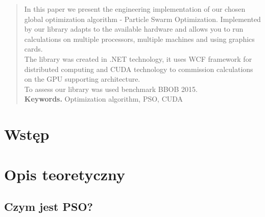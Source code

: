 \documentclass[12pt, twoside, openany, abstract=on]{report}
\theoremstyle{definition}
\begin{document}
\newpage
{}
\begin{abstract}
In this paper we present the engineering implementation of our chosen global optimization algorithm - Particle Swarm Optimization. Implemented by our library adapts to the available hardware and allows you to run calculations on multiple processors, multiple machines and using graphics cards. \\
The library was created in .NET technology, it uses WCF framework for distributed computing and CUDA technology to commission calculations on the GPU supporting architecture. \\
To assess our library was used benchmark BBOB 2015.\\

\noindent \textbf{Keywords.} Optimization algorithm, PSO, CUDA
\end{abstract}



\tableofcontents



\chapter{Wstęp}


\chapter{Opis teoretyczny} %

\section{Czym jest PSO?} %
\end{document}
